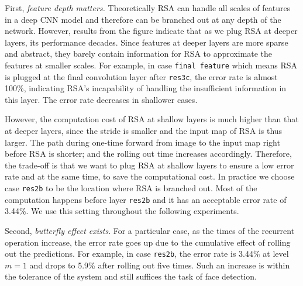 \documentclass[10pt,twocolumn,letterpaper]{article}
\begin{document}
First, \textit{feature depth matters.}
Theoretically RSA can handle all scales of features in a deep CNN model and therefore can be branched out at any depth of the network. 
%
However, results from the figure indicate that as we plug RSA at deeper layers, its performance decades. 
Since features at deeper layers are more sparse and abstract, they barely contain information for RSA to approximate the features at smaller scales. 
%
For example, in case \texttt{final feature} which means RSA is plugged at the final convolution layer after \texttt{res3c}, the error rate is almost 100\%, indicating RSA's incapability of handling the insufficient information in this layer. 
%
The error rate decreases in shallower cases.


However, the computation cost of RSA at shallow layers 
is much higher than that at deeper layers, since the stride is smaller and the input map of RSA is thus larger.
%
The path during one-time forward from image to the input map right before RSA is shorter; and the rolling out time increases accordingly.
%
Therefore, the trade-off is that we want to plug RSA at shallow layers to ensure a low error rate and at the same time, to save the computational cost.
%
In practice we choose case \texttt{res2b} to 
be the location where RSA is branched out. Most of the computation happens before layer  \texttt{res2b} and it has an acceptable error rate of 3.44\%. We use this setting throughout the following experiments. 

Second, \textit{butterfly effect exists}. For a particular case, as the times of the recurrent operation increase, the error rate goes up due to the cumulative effect of rolling out the predictions.
%
For example, in case \texttt{res2b}, the error rate is 3.44\% at level $m=1$ and drops to 5.9\% after rolling out five times. %
Such an increase is within the tolerance of the system and still suffices the task of face detection.
%





%
%
%
\end{document}
